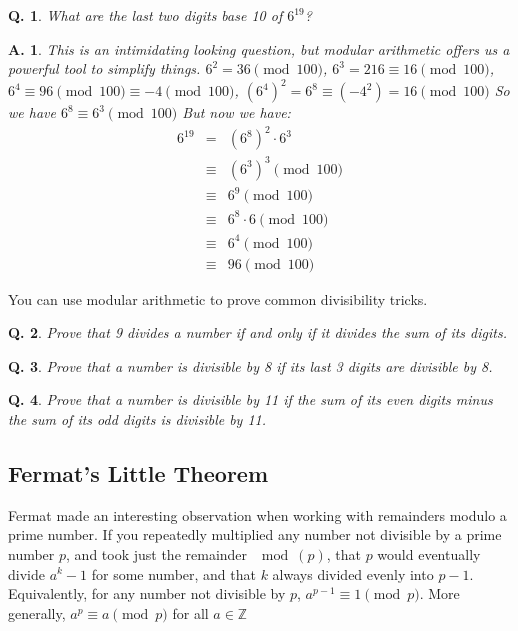 \documentclass{article}
\newtheorem{question}{Q.}
\newtheorem{answer}{A.}
\begin{document}
\begin{question}What are the last two digits base 10 of $6^{19}$?\end{question}

\begin{answer} This is an intimidating looking question, but modular arithmetic offers us a
powerful tool to simplify things. $6^2 = 36 \pmod{100}$, $6^3 = 216 \equiv 16 \pmod{100}$,
$6^4 \equiv 96 \pmod{100} \equiv -4 \pmod{100}$, $(6^4)^2 = 6^8 \equiv (-4^2) = 16 \pmod{100}$
So we have $6^8 \equiv 6^3 \pmod{100}$ But now we have: 
\begin{eqnarray*}
	6^{19} & =&  (6^8)^2\cdot 6^3 \\
               & \equiv & (6^3)^3 \pmod{100} \\
	       & \equiv & 6^{9} \pmod{100} \\
	       & \equiv & 6^8\cdot 6 \pmod{100} \\
	       & \equiv & 6^4 \pmod{100} \\
	       & \equiv & 96 \pmod{100} 
\end{eqnarray*}
\end{answer}

You can use modular arithmetic to prove common divisibility tricks.

\begin{question}Prove that 9 divides a number if and only if it divides the sum of its digits.\end{question}
\vspace*{\bigskipamount}

\begin{question}Prove that a number is divisible by 8 if its last 3 digits are divisible by 8.\end{question}
\vspace*{\bigskipamount}

\begin{question}Prove that a number is divisible by 11 if the sum of its even digits minus the
sum of its odd digits is divisible by 11.\end{question}
\vspace*{\bigskipamount}

\subsection{Fermat's Little Theorem}

Fermat made an interesting observation when working with remainders modulo a prime number. If you
repeatedly multiplied any number not divisible by a prime number $p$, and took just the remainder
$\mod (p)$, that $p$ would eventually divide $a^k - 1$ for some number, and that $k$ always divided
evenly into $p-1$. Equivalently, for any number not divisible by $p$, $a^{p-1} \equiv 1 \pmod{p}$.
More generally, $a^p \equiv a \pmod{p}$ for all $a\in \mathbb{Z}$
\end{document}
